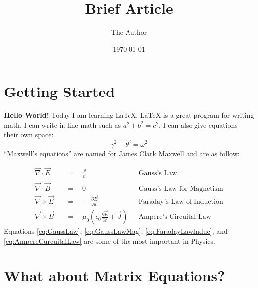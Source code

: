 \documentclass{article}   	%
\title{Brief Article}
\author{The Author}
\date{\today}							%
\begin{document}
    \maketitle

    \section{Getting Started}

    \textbf{Hello World!} Today I am learning \LaTeX. \LaTeX{} is a great program for writing math. I can write in line math such as $a^2 + b^2 = c^2$. I can also give equations their own space:
    \begin{equation}
        \gamma ^ 2 + \theta^2=\omega ^2
    \end{equation}
    ``Maxwell's equations'' are named for James Clark Maxwell and are as follow:

    \begin{align}
        \vec{\nabla}\cdot\vec{E} & \quad=\quad\frac{\rho}{\epsilon_0} && \text{Gauss's Law}
        \label{eq:GaussLaw}
        \\
        \vec{\nabla}\cdot\vec{B} &\quad=\quad0 && \text{Gauss's Law for Magnetism}
        \label{eq:GaussLawMag}
        \\
        \vec{\nabla}\times\vec{E} & \quad=\quad -\frac{\partial\vec{B}}{\partial t} && \text{Faraday's Law of Induction}
        \label{eq:FaradayLawInduc}
        \\
        \vec{\nabla}\times\vec{B} & \quad=\quad \mu_0 \left(\epsilon_0\frac{\partial\vec{E}}{\partial t}+\vec{J}\right) && \text{Ampere's Circuital Law}
        \label{eq:AmpereCurcuitalLaw}
    \end{align}
    Equations \ref{eq:GaussLaw}, \ref{eq:GaussLawMag}, \ref{eq:FaradayLawInduc}, and \ref{eq:AmpereCurcuitalLaw} are some of the most important in Physics.

    \section{What about Matrix Equations?}
\end{document}
